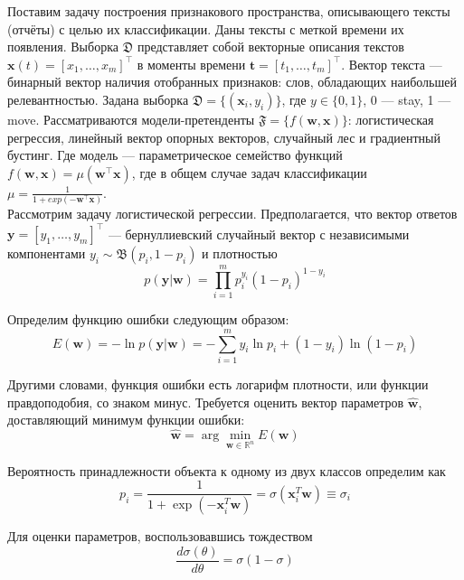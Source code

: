 \documentclass[12pt, twoside]{article}
\begin{document}
Поставим задачу построения признакового пространства, описывающего тексты (отчёты) с целью их классификации. Даны тексты с меткой времени их появления. Выборка $\mathfrak{D}$ представляет собой векторные описания текстов $\mathbf{x}(t) = [x_1, \dots, x_m]^\top$ в моменты времени $\mathbf{t} = [t_1, \dots, t_m]^\top$. Вектор текста --- бинарный вектор наличия отобранных признаков: слов, обладающих наибольшей релевантностью. Задана выборка $\mathfrak{D} = \{(\mathbf{x}_i, y_i)\}$, где $y \in \{0, 1\}$, 0 --- stay, 1 --- move. Рассматриваются модели-претенденты $\mathfrak{F} = \{f(\mathbf{w, x})\}$: логистическая регрессия, линейный вектор опорных векторов, случайный лес и градиентный бустинг. Где модель --- параметрическое семейство функций $f(\mathbf{w, x}) = \mu (\mathbf{w}^\top \mathbf{x})$, где в общем случае задач классификации $\mu = \frac{1}{1 + exp(-\mathbf{w}^\top \mathbf{x})}$. \\

Рассмотрим задачу логистической регрессии. Предполагается, что вектор ответов $\mathbf{y} = [y_1, \dots, y_m]^\top$ --- бернуллиевский случайный вектор с независимыми компонентами $y_i \sim \mathfrak{B} (p_i, 1 - p_i)$ и плотностью
\begin{equation}
p(\textbf{y} | \textbf{w}) = \prod_{i=1}^{m} p_i^{y_i} (1 - p_i)^{1 - y_i}
\end{equation}

Определим функцию ошибки следующим образом:
\begin{equation}
E(\textbf{w}) = - \ln p(\textbf{y} | \textbf{w}) = - \sum_{i=1}^{m} y_i \ln p_i + (1  - y_i) \ln (1 - p_i)
\end{equation}

Другими словами, функция ошибки есть логарифм плотности, или функции правдоподобия, со знаком минус. Требуется оценить вектор параметров $\hat{\textbf{w}}$, доставляющий минимум функции ошибки:
\begin{equation}
\hat{\textbf{w}} = \arg \min_{\textbf{w} \in \mathbb{R}^n} E(\textbf{w})
\end{equation}

Вероятность принадлежности объекта к одному из двух классов определим как
\begin{equation}\label{eq:class_prob}
p_i = \frac{1}{1 + \exp(-\textbf{x}_i^T \textbf{w})} = \sigma (\textbf{x}_i^T \textbf{w}) \equiv \sigma_i
\end{equation}

Для оценки параметров, воспользовавшись тождеством
$$\frac{d \sigma(\theta)}{d \theta} = \sigma (1 - \sigma)$$
\end{document}
